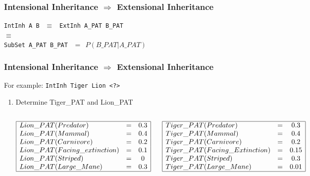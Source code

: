 \documentclass{beamer}
\begin{document}
\frame
{
  \frametitle{Intensional Inheritance $\Rightarrow$ Extensional Inheritance}
  
  \begin{center}
    {\tt IntInh A B} $\ \ \equiv \ \ $
    {\tt ExtInh A\_PAT B\_PAT}\\
    $\equiv$\\
    {\tt SubSet A\_PAT B\_PAT}
    $\ \ = \ \  P(B\_PAT|A\_PAT)$
  \end{center}
}

\frame
{

  \frametitle{Intensional Inheritance $\Rightarrow$ Extensional Inheritance}

  For example: {\tt IntInh Tiger Lion <?>}

  \pause 

  \begin{enumerate}
  \item<+-> Determine Tiger\_PAT and Lion\_PAT

    \begin{columns}
      
      \column{1.5in}
      {\tiny
        $
        \begin{array}{|lcc|}
          \hline
          Lion\_PAT(Predator) & = & 0.3\\
          Lion\_PAT(Mammal) & = & 0.4\\
          Lion\_PAT(Carnivore) & = & 0.2\\
          Lion\_PAT(Facing\_extinction) & = & 0.1\\
          Lion\_PAT(Striped) & = & 0\\
          Lion\_PAT(Large\_Mane) & = & 0.3\\
          \hline
        \end{array}
        $
      }

      \column{1.5in}      

      {\tiny
        $
        \begin{array}{|lcc|}
          \hline
          Tiger\_PAT(Predator) & = & 0.3\\
          Tiger\_PAT(Mammal) & = & 0.4\\
          Tiger\_PAT(Carnivore) & = & 0.2\\
          Tiger\_PAT(Facing\_Extinction) & = & 0.15\\
          Tiger\_PAT(Striped) & = & 0.3\\
          Tiger\_PAT(Large\_Mane) & = & 0.01\\
          \hline
        \end{array}
        $
      }
      


\end{columns}
\end{enumerate}}
\end{document}
